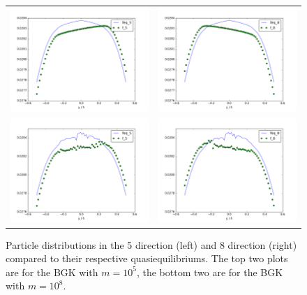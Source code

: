 \documentclass{article}
\begin{document}
\begin{figure}
\begin{tabulary}{\linewidth}{c c}
\includegraphics[width=2.1in]{figs/poise-bingham/bgk-5/feq-vs-f_5.png}
&
\includegraphics[width=2.1in]{figs/poise-bingham/bgk-5/feq-vs-f_8.png}
\\
\includegraphics[width=2.1in]{figs/poise-bingham/bgk-8/feq-vs-f_5.png}
&
\includegraphics[width=2.1in]{figs/poise-bingham/bgk-8/feq-vs-f_8.png}
\end{tabulary}
\caption{Particle distributions in the 5 direction (left) and 8 direction (right) compared to their respective quasiequilibriums. The top two plots are for the BGK with $m = 10^5$, the bottom two are for the BGK with $m = 10^8$.}
\label{fig:feq-vs-f_bgk}
\end{figure}
\end{document}

